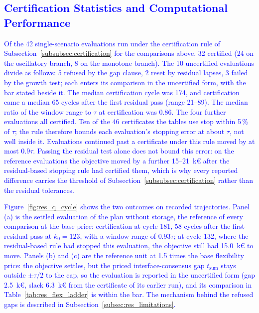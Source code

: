 \subsection{\textcolor{blue}{Certification Statistics and Computational Performance}}
\label{subsec:res_certification}

\textcolor{blue}{
    Of the 42 single-scenario evaluations run under the certification rule of Subsection~\ref{subsubsec:certification} for the comparisons above, 32 certified (24 on the oscillatory branch, 8 on the monotone branch). The 10 uncertified evaluations divide as follows: 5 refused by the gap clause, 2 reset by residual lapses, 3 failed by the growth test; each enters its comparison in the uncertified form, with the bar stated beside it. The median certification cycle was 174, and certification came a median 65 cycles after the first residual pass (range 21--89). The median ratio of the window range to $\tau$ at certification was 0.86. The four further evaluations all certified. Ten of the 46 certificates the tables use stop within 5\,\% of $\tau$; the rule therefore bounds each evaluation's stopping error at about $\tau$, not well inside it. Evaluations continued past a certificate under this rule moved by at most $0.9\tau$. Passing the residual test alone does not bound this error: on the reference evaluations the objective moved by a further 15--21~k\euro{} after the residual-based stopping rule had certified them, which is why every reported difference carries the threshold of Subsection~\ref{subsubsec:certification} rather than the residual tolerances.
}

\textcolor{blue}{
    Figure~\ref{fig:res_q_cycle} shows the two outcomes on recorded trajectories. Panel (a) is the settled evaluation of the plan without storage, the reference of every comparison at the base price: certification at cycle 181, 58 cycles after the first residual pass at $k_0 = 123$, with a window range of $0.93\tau$; at cycle 132, where the residual-based rule had stopped this evaluation, the objective still had 15.0~k\euro{} to move. Panels (b) and (c) are the reference unit at 1.5 times the base flexibility price: the objective settles, but the priced interface-consensus gap $t_{\text{sum}}$ stays outside $\pm\tau/2$ to the cap, so the evaluation is reported in the uncertified form (gap 2.5~k\euro, slack 6.3~k\euro{} from the certificate of its earlier run), and its comparison in Table~\ref{tab:res_flex_ladder} is within the bar. The mechanism behind the refused gaps is described in Subsection~\ref{subsec:res_limitations}.
}

